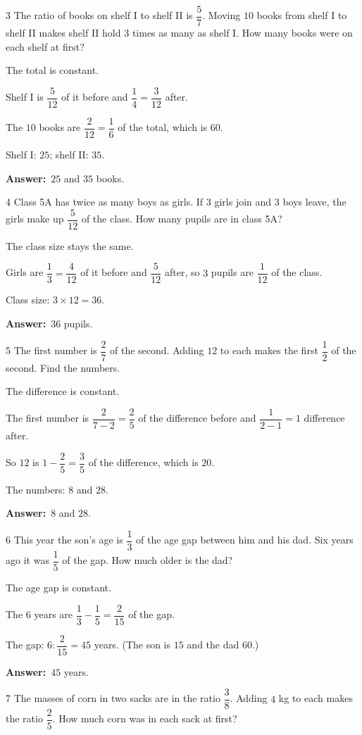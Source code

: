 \documentclass[11pt]{article}
\newif\ifsol \solfalse
\providecommand{\AnsWord}{Đáp số}
\newcommand{\dapso}[1]{\par\textbf{\AnsWord:}\ #1}
\newcommand{\probsol}[1]{%
  \begin{lrbox}{\solmeasure}\begin{minipage}{\dimexpr\linewidth-24pt\relax}#1\end{minipage}\end{lrbox}%
  \ifsol
    \begin{solbox}#1\end{solbox}%
  \else
    \setlength{\solht}{\dimexpr\ht\solmeasure+\dp\solmeasure+0.85cm\relax}%
    \ifdim\solht<1.35cm\setlength{\solht}{1.35cm}\fi
    \begin{tcolorbox}[colback=white,colframe=Line,boxrule=0.8pt,arc=5pt,
      left=8pt,right=8pt,top=4pt,bottom=4pt,height=\solht]{\footnotesize\color{Slate}\itshape\WorkWord}\end{tcolorbox}%
  \fi}
\newcommand{\gap}{\vspace{0.3cm}}
\def\WorkWord{Your work:}
\def\AnsWord{Answer}
\begin{document}
\gap
\begin{probbox}{3}{\relax}
The ratio of books on shelf I to shelf II is $\dfrac57$. Moving $10$ books from shelf I to shelf II makes shelf II hold $3$ times as many as shelf I. How many books were on each shelf at first?
\end{probbox}
\probsol{
The total is constant.\par Shelf I is $\dfrac5{12}$ of it before and $\dfrac14=\dfrac3{12}$ after.\par The $10$ books are $\dfrac2{12}=\dfrac16$ of the total, which is $60$.\par
Shelf I: $25$; shelf II: $35$.
\dapso{$25$ and $35$ books.}}
\gap
\begin{probbox}{4}{\relax}
Class 5A has twice as many boys as girls. If $3$ girls join and $3$ boys leave, the girls make up $\dfrac5{12}$ of the class. How many pupils are in class 5A?
\end{probbox}
\probsol{
The class size stays the same.\par Girls are $\dfrac13=\dfrac4{12}$ of it before and $\dfrac5{12}$ after, so $3$ pupils are $\dfrac1{12}$ of the class.\par
Class size: $3\times12=36$.
\dapso{$36$ pupils.}}
\gap
\begin{probbox}{5}{\relax}
The first number is $\dfrac27$ of the second. Adding $12$ to each makes the first $\dfrac12$ of the second. Find the numbers.
\end{probbox}
\probsol{
The difference is constant.\par The first number is $\dfrac2{7-2}=\dfrac25$ of the difference before and $\dfrac1{2-1}=1$ difference after.\par
So $12$ is $1-\dfrac25=\dfrac35$ of the difference, which is $20$.\par The numbers: $8$ and $28$.
\dapso{$8$ and $28$.}}
\gap
\begin{probbox}{6}{\relax}
This year the son's age is $\dfrac13$ of the age gap between him and his dad. Six years ago it was $\dfrac15$ of the gap. How much older is the dad?
\end{probbox}
\probsol{
The age gap is constant.\par The $6$ years are $\dfrac13-\dfrac15=\dfrac2{15}$ of the gap.\par
The gap: $6:\dfrac2{15}=45$ years. (The son is $15$ and the dad $60$.)
\dapso{$45$ years.}}
\gap
\begin{probbox}{7}{\relax}
The masses of corn in two sacks are in the ratio $\dfrac38$. Adding $4$ kg to each makes the ratio $\dfrac25$. How much corn was in each sack at first?
\end{probbox}
\end{document}
